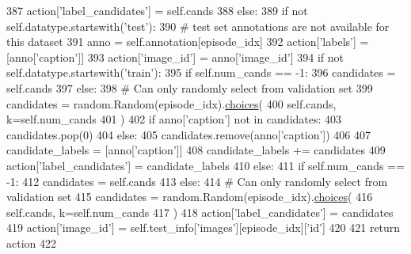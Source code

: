 \begin{DoxyCode}
387                     action[\textcolor{stringliteral}{'label\_candidates'}] = self.cands
388         \textcolor{keywordflow}{else}:
389             \textcolor{keywordflow}{if} \textcolor{keywordflow}{not} self.datatype.startswith(\textcolor{stringliteral}{'test'}):
390                 \textcolor{comment}{# test set annotations are not available for this dataset}
391                 anno = self.annotation[episode\_idx]
392                 action[\textcolor{stringliteral}{'labels'}] = [anno[\textcolor{stringliteral}{'caption'}]]
393                 action[\textcolor{stringliteral}{'image\_id'}] = anno[\textcolor{stringliteral}{'image\_id'}]
394                 \textcolor{keywordflow}{if} \textcolor{keywordflow}{not} self.datatype.startswith(\textcolor{stringliteral}{'train'}):
395                     \textcolor{keywordflow}{if} self.num\_cands == -1:
396                         candidates = self.cands
397                     \textcolor{keywordflow}{else}:
398                         \textcolor{comment}{# Can only randomly select from validation set}
399                         candidates = random.Random(episode\_idx).\hyperlink{namespaceparlai_1_1mturk_1_1tasks_1_1personachat_1_1personachat__chat_1_1extract__and__save__personas_a2def58d59437334ec072a3d644c0a577}{choices}(
400                             self.cands, k=self.num\_cands
401                         )
402                     \textcolor{keywordflow}{if} anno[\textcolor{stringliteral}{'caption'}] \textcolor{keywordflow}{not} \textcolor{keywordflow}{in} candidates:
403                         candidates.pop(0)
404                     \textcolor{keywordflow}{else}:
405                         candidates.remove(anno[\textcolor{stringliteral}{'caption'}])
406 
407                     candidate\_labels = [anno[\textcolor{stringliteral}{'caption'}]]
408                     candidate\_labels += candidates
409                     action[\textcolor{stringliteral}{'label\_candidates'}] = candidate\_labels
410             \textcolor{keywordflow}{else}:
411                 \textcolor{keywordflow}{if} self.num\_cands == -1:
412                     candidates = self.cands
413                 \textcolor{keywordflow}{else}:
414                     \textcolor{comment}{# Can only randomly select from validation set}
415                     candidates = random.Random(episode\_idx).\hyperlink{namespaceparlai_1_1mturk_1_1tasks_1_1personachat_1_1personachat__chat_1_1extract__and__save__personas_a2def58d59437334ec072a3d644c0a577}{choices}(
416                         self.cands, k=self.num\_cands
417                     )
418                 action[\textcolor{stringliteral}{'label\_candidates'}] = candidates
419                 action[\textcolor{stringliteral}{'image\_id'}] = self.test\_info[\textcolor{stringliteral}{'images'}][episode\_idx][\textcolor{stringliteral}{'id'}]
420 
421         \textcolor{keywordflow}{return} action
422 
\end{DoxyCode}
